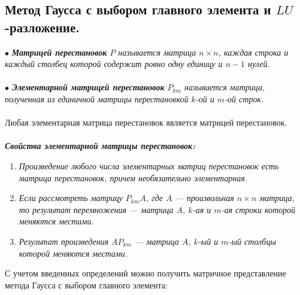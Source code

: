\documentclass[a4paper, 12pt]{report}
\begin{document}
	\subsection{Метод Гаусса с выбором главного элемента и $LU$-разложение.}
	$\bullet$ \textit{\textbf{Матрицей перестановок} $P$ называется матрица $n\times n$, каждая строка и каждый столбец которой содержит ровно одну единицу и $n-1$ нулей.}\\\\
	$\bullet$ \textit{\textbf{Элементарной матрицей перестановок} $P_{km}$ называется матрица, полученная из единичной матрицы перестановкой $k$-ой и $m$-ой строк.}\\\\
	Любая элементарная матрица перестановок является матрицей перестановок.\\\\
	\textbf{\textit{Свойства элементарной матрицы перестановок:}}
	\begin{enumerate}
		\item \textit{Произведение любого числа элементарных матриц перестановок есть матрица перестановок, причем необязательно элементарная.}
		\item \textit{Если рассмотреть матрицу $P_{km}A$, где $A$ --- произвольная $n\times n$ матрица, то результат перемножения --- матрица $A$, $k$-ая и $m$-ая строки которой меняются местами.}
		\item \textit{Результат произведения $AP_{km}$ --- матрица $A$, $k$-ый и $m$-ый столбцы которой меняются местами.}
	\end{enumerate}
	С учетом введенных определений можно получить матричное представление метода Гаусса с выбором главного элемента:
\end{document}

